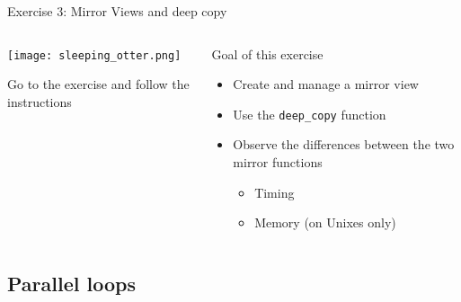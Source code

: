 \documentclass[
    aspectratio=169,
    handout,
]{beamer}
\begin{document}

\begin{exerciseframe}{Exercise 3: Mirror Views and deep copy}
    \begin{columns}
        \begin{column}{0.5\linewidth}
            \begin{center}
                \texttt{[image: sleeping\_otter.png]}
            \end{center}

            Go to the exercise  and follow the instructions
        \end{column}
        \begin{column}{0.5\linewidth}
            \begin{block}{Goal of this exercise}
                \begin{itemize}
                    \item Create and manage a mirror view
                    \item Use the \texttt{deep\_copy} function
                    \item Observe the differences between the two mirror functions
                    \begin{itemize}
                        \item Timing
                        \item Memory (on Unixes only)
                    \end{itemize}
                \end{itemize}
            \end{block}
        \end{column}
    \end{columns}
\end{exerciseframe}


\subsection{Parallel loops}

\end{document}
